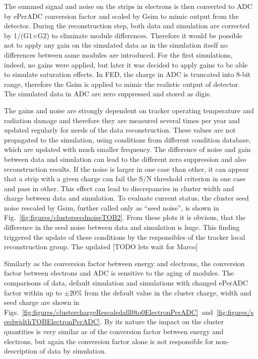  The summed signal and noise on the strips in electrons is then converted to ADC by ePerADC conversion factor and scaled by Gsim to mimic output from the detector. During the reconstruction step, both data and simulation are corrected by 1/(G1$\times$G2) to eliminate module differences. Therefore it would be possible not to apply any gain on the simulated data as in the simulation itself no differences between same modules are introduced. For the first simulations, indeed, no gains were applied, but later it was decided to apply gains to be able to simulate saturation effects. In FED, the charge in ADC is truncated into 8-bit range, therefore the Gsim is applied to mimic the realistic output of detector. The simulated data in ADC are zero suppressed and stored as digis.
 

The gains and noise are strongly dependent on tracker operating temperature and radiation damage and therefore they are measured several times per year and updated regularly for needs of the data reconstruction. These values are not propagated to the simulation, using conditions from different condition database, which are updated with much smaller frequency. The difference of noise and gain between data and simulation can lead to the different zero suppression and also reconstruction results. If the noise is larger in one case than other, it can appear that a strip with a given charge can fail the S/N threshold criterion in one case and pass in other. This effect can lead to discrepancies in cluster width and charge between data and simulation. To evaluate current status, the cluster seed noise rescaled by Gsim, further called only as ``seed noise'', is shown in Fig.~\ref{fig:figures/clusterseednoiseTOB2}. From these plots it is obvious, that the difference in the seed noise between data and simulation is huge. This finding triggered the update of these conditions by the responsibles of the tracker local reconstruction group. The updated [TODO lets wait for Marco] 

Similarly as the conversion factor between energy and electrons, the conversion factor between electrons and ADC is sensitive to the aging of modules. The comparisons of data, default simulation and simulations with changed ePerADC factor within up to $\pm 20\%$ from the default value in the cluster charge, width and seed charge are shown in Figs.~\ref{fig:figures/clusterchargeRescaledalll0to0ElectronPerADC}~and~\ref{fig:figures/seedwidthTOBElectronPerADC}. By its nature the impact on the cluster quantities is very similar as of the conversion factor between energy and electrons, but again the conversion factor alone is not responsible for non-description of data by simulation.  

